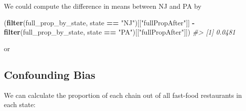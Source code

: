 \documentclass[]{book}
\newenvironment{Shaded}{\begin{snugshade}}{\end{snugshade}}
\newcommand{\CommentTok}[1]{\textcolor[rgb]{0.56,0.35,0.01}{\textit{#1}}}
\newcommand{\DataTypeTok}[1]{\textcolor[rgb]{0.13,0.29,0.53}{#1}}
\newcommand{\KeywordTok}[1]{\textcolor[rgb]{0.13,0.29,0.53}{\textbf{#1}}}
\newcommand{\NormalTok}[1]{#1}
\newcommand{\OperatorTok}[1]{\textcolor[rgb]{0.81,0.36,0.00}{\textbf{#1}}}
\newcommand{\StringTok}[1]{\textcolor[rgb]{0.31,0.60,0.02}{#1}}
\theoremstyle{definition}
\theoremstyle{definition}
\theoremstyle{definition}
\theoremstyle{remark}
\begin{document}
\begin{Shaded}
\end{Shaded}

We could compute the difference in means between NJ and PA by

\begin{Shaded}
\begin{Highlighting}[]
\NormalTok{(}\KeywordTok{filter}\NormalTok{(full_prop_by_state, state }\OperatorTok{==}\StringTok{ "NJ"}\NormalTok{)[[}\StringTok{"fullPropAfter"}\NormalTok{]] }\OperatorTok{-}
\StringTok{  }\KeywordTok{filter}\NormalTok{(full_prop_by_state, state }\OperatorTok{==}\StringTok{ "PA"}\NormalTok{)[[}\StringTok{"fullPropAfter"}\NormalTok{]])}
\CommentTok{#> [1] 0.0481}
\end{Highlighting}
\end{Shaded}

or

\begin{Shaded}
\end{Shaded}

\hypertarget{confounding-bias}{%
\subsection{Confounding Bias}\label{confounding-bias}}

We can calculate the proportion of each chain out of all fast-food
restaurants in each state:
\end{document}
